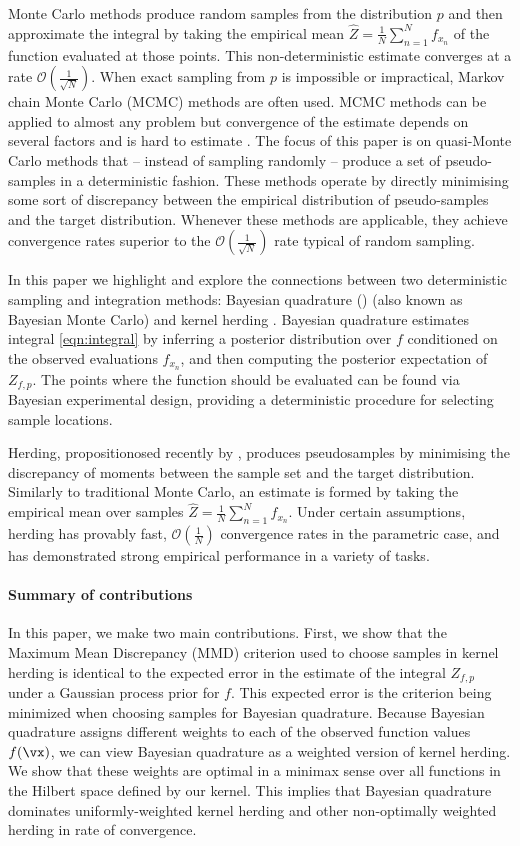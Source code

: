 Monte Carlo methods produce random samples from the distribution $p$ and then approximate the integral by taking the empirical mean $\hat{Z} = \frac{1}{N}\sum_{n=1}^{N}f_{x_n}$ of the function evaluated at those points. This non-deterministic estimate converges at a rate $\mathcal{O}(\frac{1}{\sqrt{N}})$. When exact sampling from $p$ is impossible or impractical, Markov chain Monte Carlo (MCMC) methods are often used. MCMC methods can be applied to almost any problem but convergence of the estimate depends on several factors and is hard to estimate \citep{CowlesCarlin96}. The focus of this paper is on quasi-Monte Carlo methods that -- instead of sampling randomly -- produce a set of pseudo-samples in a deterministic fashion. These methods operate by directly minimising some sort of discrepancy between the empirical distribution of pseudo-samples and the target distribution. Whenever these methods are applicable, they achieve convergence rates superior to the $\mathcal{O}(\frac{1}{\sqrt{N}})$ rate typical of random sampling.

In this paper we highlight and explore the connections between two deterministic sampling and integration methods: Bayesian quadrature (\bq{}) \citep{BZHermiteQuadrature,BZMonteCarlo} (also known as Bayesian Monte Carlo) and kernel herding \citep{chen2010super}. Bayesian quadrature estimates integral \eqref{eqn:integral} by inferring a posterior distribution over $f$ conditioned on the observed evaluations $f_{x_n}$, and then computing the posterior expectation of $Z_{f,p}$. The points where the function should be evaluated can be found via Bayesian experimental design, providing a deterministic procedure for selecting sample locations.

Herding, propositionosed recently by \citep{chen2010super}, produces pseudosamples by minimising the discrepancy of moments between the sample set and the target distribution. Similarly to traditional Monte Carlo, an estimate is formed by taking the empirical mean over samples $\hat{Z} = \frac{1}{N}\sum_{n=1}^{N}f_{x_n}$. Under certain assumptions, herding has provably fast, $\mathcal{O}(\frac{1}{N})$ convergence rates in the parametric case, and has demonstrated strong empirical performance in a variety of tasks.

\paragraph{Summary of contributions} In this paper, we make two main contributions.  First, we show that the Maximum Mean Discrepancy (MMD) criterion used to choose samples in kernel herding is identical to the expected error in the estimate of the integral $Z_{f,p}$ under a Gaussian process prior for $f$.  This expected error is the criterion being minimized when choosing samples for Bayesian quadrature.  Because Bayesian quadrature assigns different weights to each of the observed function values $f(\vx)$, we can view Bayesian quadrature as a weighted version of kernel herding.  We show that these weights are optimal in a minimax sense over all functions in the Hilbert space defined by our kernel.  This implies that Bayesian quadrature dominates uniformly-weighted kernel herding and other non-optimally weighted herding in rate of convergence.

